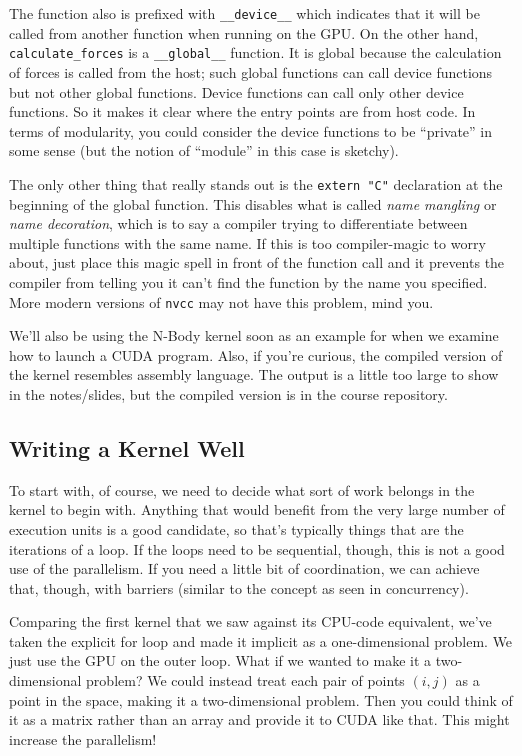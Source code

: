The function also is prefixed with \texttt{\_\_device\_\_} which indicates that it will be called from another function when running on the GPU. On the other hand, \texttt{calculate\_forces} is a \texttt{\_\_global\_\_} function. It is global because the calculation of forces is called from the host; such global functions can call device functions but not other global functions. Device functions can call only other device functions. So it makes it clear where the entry points are from host code. In terms of modularity, you could consider the device functions to be ``private'' in some sense (but the notion of ``module'' in this case is sketchy).

The only other thing that really stands out is the \texttt{extern "C"} declaration at the beginning of the global function. This disables what is called \textit{name mangling} or \textit{name decoration}, which is to say a compiler trying to differentiate between multiple functions with the same name. If this is too compiler-magic to worry about, just place this magic spell in front of the function call and it prevents the compiler from telling you it can't find the function by the name you specified. More modern versions of \texttt{nvcc} may not have this problem, mind you.

We'll also be using the N-Body kernel soon as an example for when we examine how to launch a CUDA program. Also, if you're curious, the compiled version of the kernel resembles assembly language. The output is a little too large to show in the notes/slides, but the compiled version is in the course repository.

\subsection*{Writing a Kernel Well}

To start with, of course, we need to decide what sort of work belongs in the kernel to begin with. Anything that would benefit from the very large number of execution units is a good candidate, so that's typically things that are the iterations of a loop. If the loops need to be sequential, though, this is not a good use of the parallelism. If you need a little bit of coordination, we can achieve that, though, with barriers (similar to the concept as seen in concurrency). 

Comparing the first kernel that we saw against its CPU-code equivalent, we've taken the explicit for loop and made it implicit as a one-dimensional problem. We just use the GPU on the outer loop. What if we wanted to make it a two-dimensional problem? We could instead treat each pair of points $(i, j)$ as a point in the space, making it a two-dimensional problem. Then you could think of it as a matrix rather than an array and provide it to CUDA like that. This might increase the parallelism! 

